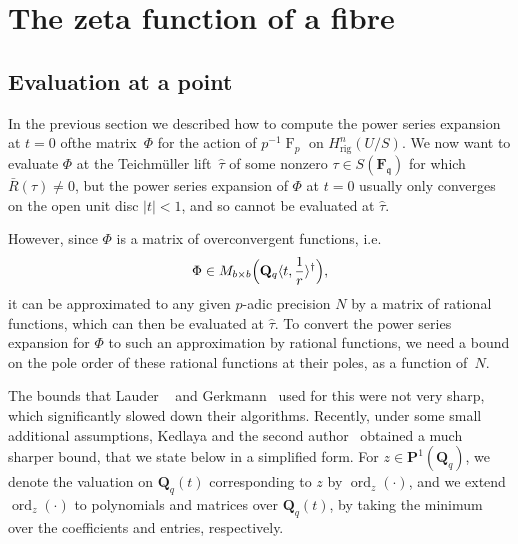 \documentclass[a4paper,11pt]{article}
\numberwithin{equation}{section}
\providecommand{\abs}[1]{\lvert#1\rvert}                 %
\newcommand{\QQ}{\mathbf{Q}} %
\newcommand{\FF}{\mathbf{F}} %
\DeclareMathOperator{\ord}{ord}          %
\DeclareMathOperator{\Frob}{F}           %
\providecommand{\Hrig}{H_{\text{rig}}}  %
\theoremstyle{definition}
\begin{document}

\section{The zeta function of a fibre}

\label{sec:ZetaFunctions}

\subsection{Evaluation at a point}

In the previous section we described how to compute the power series 
expansion at $t=0$ ofthe matrix~$\Phi$ for the action of $p^{-1} \Frob_p$ on 
$\Hrig^{n}(U/S)$. We now want to evaluate $\Phi$ at the Teichm\"uller 
lift~$\hat{\tau}$ of some nonzero $\tau \in S(\FF_{\mathfrak{q}})$ for 
which $\bar{R}(\tau) \neq 0$, but the power series expansion of $\Phi$ 
at $t=0$ usually only converges on the open unit disc $\abs{t} < 1$, 
and so cannot be evaluated at $\hat{\tau}$. 

However, since $\Phi$ is a matrix of overconvergent functions, i.e.\ 
\[
\Phi \in M_{b \times b}\Bigl(\QQ_q \langle t,\frac{1}{r} \rangle^{\dag}\Bigr),
\]
it can be approximated to any given $p$-adic precision $N$ by a matrix 
of rational functions, which can then be evaluated at $\hat{\tau}$. To 
convert the power series expansion for $\Phi$ to such an approximation 
by rational functions, we need a bound on the pole order of these 
rational functions at their poles, as a function of~$N$.

The bounds that Lauder ~\citep[\S 8.1]{Lauder2004a} and 
Gerkmann~\citep[\S 6]{Gerkmann2007} used for this were not very
sharp, which significantly slowed down their algorithms.
Recently, under some small additional assumptions, Kedlaya and the second 
author~\citep[Theorem~2.1]{KedlayaTuitman2012} obtained a much sharper bound,
that we state below in a simplified form. For $z \in \mathbf{P}^1(\QQ_q)$, we
denote the valuation on $\QQ_q(t)$ corresponding to $z$ by $\ord_z(\cdot)$, and
we extend $\ord_z(\cdot)$ to polynomials and matrices over $\QQ_q(t)$, by
taking the minimum over the coefficients and entries, respectively.
\end{document}
